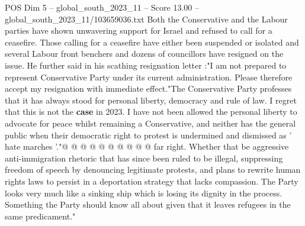 \begin{textsample}{POS Dim 5 – global\_south\_2023\_11 – Score 13.00 – global\_south\_2023\_11/103659036.txt}
Both the Conservative and the Labour parties have shown unwavering support for Israel and refused to call for a ceasefire.
Those calling for a ceasefire have either been suspended or isolated and several Labour front benchers and dozens of councillors have resigned on the issue.
He further said in his scathing resignation letter :"I am not prepared to represent Conservative Party under its current administration.
Please therefore accept my resignation with immediate effect."The Conservative Party professes that it has always stood for personal liberty, democracy and rule of law.
I regret that this is not the \textbf{case} in 2023.
I have not been allowed the personal liberty to advocate for peace whilst remaining a Conservative, and neither has the general public when their democratic right to protest is undermined and dismissed as ' hate marches '."@ @ @ @ @ @ @ @ @ @ far right.
Whether that be aggressive anti-immigration rhetoric that has since been ruled to be illegal, suppressing freedom of speech by denouncing legitimate protests, and plans to rewrite human rights laws to persist in a deportation strategy that lacks compassion.
The Party looks very much like a sinking ship which is losing its dignity in the process.
Something the Party should know all about given that it leaves refugees in the same predicament."

\end{textsample}
